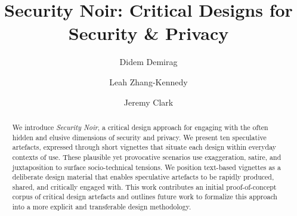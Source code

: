 \documentclass[sigconf]{acmart}
\begin{document}
\title{Security Noir: Critical Designs for Security \& Privacy}

\author{Didem Demirag}


\author{Leah Zhang-Kennedy}

\author{Jeremy Clark}

\begin{abstract}

We introduce \textit{Security Noir}, a critical design approach for engaging with the often hidden and elusive dimensions of security and privacy. We present ten speculative artefacts, expressed through short vignettes that situate each design within everyday contexts of use. These plausible yet provocative scenarios use exaggeration, satire, and juxtaposition to surface socio-technical tensions. We position text-based vignettes as a deliberate design material that enables speculative artefacts to be rapidly produced, shared, and critically engaged with. This work contributes an initial proof-of-concept corpus of critical design artefacts and outlines future work to formalize this approach into a more explicit and transferable design methodology.


\end{abstract}

\maketitle


\end{document}
